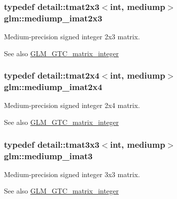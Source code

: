 \subsubsection[{\texorpdfstring{mediump\+\_\+imat2x3}{mediump_imat2x3}}]{\setlength{\rightskip}{0pt plus 5cm}typedef detail\+::tmat2x3$<$int, mediump$>$ {\bf glm\+::mediump\+\_\+imat2x3}}\hypertarget{group__gtc__matrix__integer_gabc92c714c2d257213c5b0771669df177}{}\label{group__gtc__matrix__integer_gabc92c714c2d257213c5b0771669df177}
Medium-\/precision signed integer 2x3 matrix. \begin{DoxySeeAlso}{See also}
\hyperlink{group__gtc__matrix__integer}{G\+L\+M\+\_\+\+G\+T\+C\+\_\+matrix\+\_\+integer} 
\end{DoxySeeAlso}
\subsubsection[{\texorpdfstring{mediump\+\_\+imat2x4}{mediump_imat2x4}}]{\setlength{\rightskip}{0pt plus 5cm}typedef detail\+::tmat2x4$<$int, mediump$>$ {\bf glm\+::mediump\+\_\+imat2x4}}\hypertarget{group__gtc__matrix__integer_ga90b020de8489a1d4424c0ffcc17c83dd}{}\label{group__gtc__matrix__integer_ga90b020de8489a1d4424c0ffcc17c83dd}
Medium-\/precision signed integer 2x4 matrix. \begin{DoxySeeAlso}{See also}
\hyperlink{group__gtc__matrix__integer}{G\+L\+M\+\_\+\+G\+T\+C\+\_\+matrix\+\_\+integer} 
\end{DoxySeeAlso}
\subsubsection[{\texorpdfstring{mediump\+\_\+imat3}{mediump_imat3}}]{\setlength{\rightskip}{0pt plus 5cm}typedef detail\+::tmat3x3$<$int, mediump$>$ {\bf glm\+::mediump\+\_\+imat3}}\hypertarget{group__gtc__matrix__integer_ga6b438ab863af0122b532adc93b89105e}{}\label{group__gtc__matrix__integer_ga6b438ab863af0122b532adc93b89105e}
Medium-\/precision signed integer 3x3 matrix. \begin{DoxySeeAlso}{See also}
\hyperlink{group__gtc__matrix__integer}{G\+L\+M\+\_\+\+G\+T\+C\+\_\+matrix\+\_\+integer} 
\end{DoxySeeAlso}
